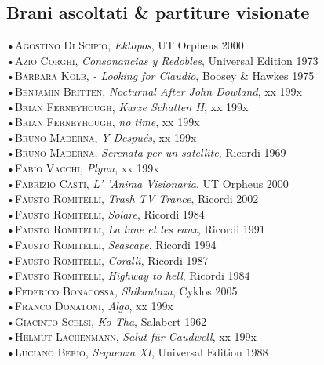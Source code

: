\documentclass[oneside]{article}
\begin{document}
\begin{multicols*}{2}
\section{ Brani ascoltati \& partiture visionate}
•\textsc{\textsf {Agostino Di Scipio}}, \emph{Ektopos}, UT Orpheus 2000\\
•\textsc{\textsf {Azio Corghi}}, \emph{Consonancias y Redobles}, Universal Edition 1973\\
•\textsc{\textsf {Barbara Kolb}}, \emph{ - Looking for Claudio}, Boosey \& Hawkes 1975\\
•\textsc{\textsf {Benjamin Britten}}, \emph{Nocturnal After John Dowland}, xx 199x\\
•\textsc{\textsf {Brian Ferneyhough}}, \emph{Kurze Schatten II}, xx 199x\\
•\textsc{\textsf {Brian Ferneyhough}}, \emph{no time}, xx 199x\\
•\textsc{\textsf {Bruno Maderna}}, \emph{Y Después}, xx 199x\\
•\textsc{\textsf {Bruno Maderna}}, \emph{Serenata per un satellite}, Ricordi 1969\\
•\textsc{\textsf {Fabio Vacchi}}, \emph{Plynn}, xx 199x\\
•\textsc{\textsf {Fabrizio Casti}}, \emph{ L' 'Anima Visionaria}, UT Orpheus 2000\\
•\textsc{\textsf {Fausto Romitelli}}, \emph{Trash TV Trance}, Ricordi 2002\\
•\textsc{\textsf {Fausto Romitelli}}, \emph{Solare}, Ricordi 1984\\
•\textsc{\textsf {Fausto Romitelli}}, \emph{La lune et les eaux}, Ricordi 1991\\
•\textsc{\textsf {Fausto Romitelli}}, \emph{Seascape}, Ricordi 1994\\
•\textsc{\textsf {Fausto Romitelli}}, \emph{Coralli}, Ricordi 1987\\
•\textsc{\textsf {Fausto Romitelli}}, \emph{Highway to hell}, Ricordi 1984\\
•\textsc{\textsf {Federico Bonacossa}}, \emph{Shikantaza}, Cyklos 2005\\
•\textsc{\textsf {Franco Donatoni}}, \emph{Algo}, xx 199x\\
•\textsc{\textsf {Giacinto Scelsi}}, \emph{Ko-Tha}, Salabert 1962\\
•\textsc{\textsf {Helmut Lachenmann}}, \emph{Salut für Caudwell}, xx 199x\\
•\textsc{\textsf {Luciano Berio}}, \emph{Sequenza XI}, Universal Edition 1988\\

\end{multicols*}
\end{document}
